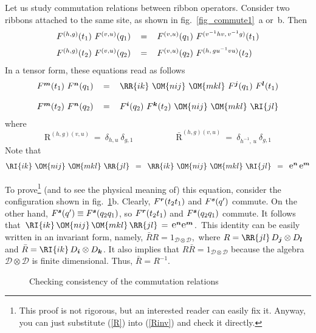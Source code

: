 \documentclass[12pt]{article}
\newcommand*{\epsfscale}[1]{\def\epsfsize##1##2{#1##1}}
\newcommand{\rE}{\mbox{\large$\mathrm e$}}
\newcommand{\rR}{\mathrm{R}}
\newcommand{\rI}{\bar{\mathrm{R}}}
\newcommand{\del}{\delta} %
\newcommand*{\boldind}[1]{{\mbox{\scriptsize\boldmath$#1$}}}
\newcommand*{\RD}[1]{D_\boldind{#1}}
\newcommand*{\RF}[1]{F^\boldind{#1}}
\newcommand*{\RE}[1]{\rE^\boldind{#1}}
\newcommand{\calD}{\mathcal{D}}
\begin{document}
Let us study commutation relations between ribbon operators. Consider two
ribbons attached to the same site, as shown in fig.~\ref{fig_commute1}~a
or~b. Then
\[
  \begin{array}{rcl}
    F^{(h,g)}(t_1)\ F^{(v,u)}(q_1)\,&=&\, 
    F^{(v,u)}(q_1)\ F^{(v^{-1}hv,\,v^{-1}g)}(t_1)  \medskip\\
    F^{(h,g)}(t_2)\ F^{(v,u)}(q_2)\,&=&\,
    F^{(v,u)}(q_2)\ F^{(h,\,gu^{-1}vu)}(t_2)
  \end{array}
\]
In a tensor form, these equations read as follows
\begin{equation} \label{ribcommute}
  \begin{array}{rcl}
    \RF{m}(t_1)\ \RF{n}(q_1)\,&=&\, 
    \RR{ik}\ \OM{nij}\ \OM{mkl}\ \RF{j}(q_1)\ \RF{l}(t_1)  \bigskip\\
    \RF{m}(t_2)\ \RF{n}(q_2)\,&=&\,
    \RF{i}(q_2)\ \RF{k}(t_2)\ \OM{nij}\ \OM{mkl}\ \RI{jl}
  \end{array}
\end{equation}
where
\begin{equation} \label{R}
  \rR^{(h,g)(v,u)}\ =\ \del_{h,u}\ \del_{g,1} \qquad\qquad\quad
  \rI^{(h,g)(v,u)}\ =\ \del_{h^{-1}\!,\,u}\ \del_{g,1}  
\end{equation}
Note that 
\begin{equation} \label{Rinv}
  \RI{ik}\ \OM{nij}\ \OM{mkl}\ \RR{jl}\,\ =\,\ 
  \RR{ik}\ \OM{nij}\ \OM{mkl}\ \RI{jl}\,\ =\,\ \RE{n}\,\RE{m}
\end{equation}

To prove\footnote{ 
 This proof is not rigorous, but an interested reader can
 easily fix it. Anyway, you can just substitute (\ref{R}) into (\ref{Rinv})
 and check it directly.}
(and to see the physical meaning of) this equation, consider the configuration
shown in fig.~\ref{fig_commute2}b. Clearly, $\RF{r}(t_2t_1)$ and $\RF{s}(q')$
commute. On the other hand, $\RF{s}(q')\equiv\RF{s}(q_2q_1)$, so
$\RF{r}(t_2t_1)$ and $\RF{s}(q_2q_1)$ commute. It follows that\,
$\RI{ik}\,\OM{nij}\,\OM{mkl}\,\RR{jl}\,=\,\RE{n}\RE{m}$.\, This identity can
be easily written in an invariant form, namely, $\bar
RR=1_{\calD\otimes\calD}$,\, where $R=\RR{jl}\,\RD{j}\otimes\RD{l}$\, and
$\bar R=\RI{ik}\,\RD{i}\otimes\RD{k}$. It also implies that $R\bar
R=1_{\calD\otimes\calD}$ because the algebra $\calD\otimes\calD$ is finite
dimensional. Thus, $\bar R=R^{-1}$.

\begin{figure}[t]
\centerline{\epsfscale{0.6}}
\caption{Checking consistency of the commutation relations}
\label{fig_commute2}
\end{figure}
\end{document}
